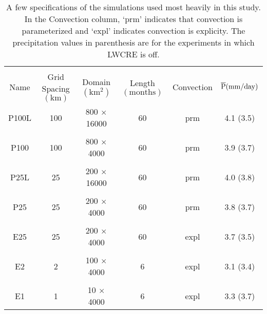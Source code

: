 \documentclass[11pt]{article}   	%
\begin{document}
\begin{table}
\begin{center}
\caption{A few specifications of the simulations used most heavily in this study.  In the Convection
column, `prm'  indicates that convection is parameterized and `expl' indicates convection is explicity.  
The precipitation values in parenthesis are for the experiments in which LWCRE is off.}
    \begin{tabular}{*{6}{c}}
    \hline
    \hline
    \\
 Name & Grid Spacing $(\mathrm{km})$ & Domain $ (\mathrm{km^2}) $& Length $(\mathrm{months}) $ & Convection & 
 $\overline{\rm{P}} (\mathrm{mm/day})$    \\ \hline
  P100L &  100          &   800 $\times$ 16000    &  60              & prm           &  4.1 (3.5)          \\ 
    \\
  P100 &  100                & 800 $\times$ 4000     & 60            & prm         & 3.9 (3.7)               \\  
    \\
  P25L &  25             & 200 $\times$ 16000      & 60             & prm          & 4.0 (3.8)                \\  
    \\
  P25  &  25             & 200 $\times$ 4000      & 60             & prm           & 3.8 (3.7)               \\  
    \\
 E25  &   25          & 200 $\times$ 4000      & 60             & expl          & 3.7 (3.5)               \\  
    \\
 E2   &   2          & 100 $\times$ 4000      & 6             & expl          & 3.1 (3.4)                \\ 
    \\
 E1   &   1          & 10 $\times$ 4000      & 6             & expl          & 3.3 (3.7)                \\  \hline

    \end{tabular}\par
    \label{tab:lambda}
\end{center}
\end{table}
\end{document}
